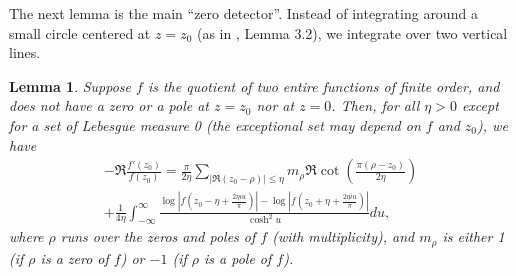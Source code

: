 \documentclass[10pt]{amsart}
\theoremstyle{remark}
\theoremstyle{plain}
\newtheorem{lemma}{Lemma}[section]
\numberwithin{equation}{section}
\theoremstyle{definition}
\def\({\left(}
\def\){\right)}
\def\pfrac#1#2{\left(\frac{#1}{#2}\right)}
\begin{document}
The next lemma is the main ``zero detector''.  Instead of integrating
around a small circle centered at $z=z_0$ (as in \cite{HB2}, Lemma 3.2),
we integrate over two vertical lines.

\begin{lemma}\label{lem:zero detect}
Suppose $f$ is the quotient of two entire 
functions of finite order, and does not have a zero or a pole at $z=z_0$ nor
at $z=0$.
Then, for all $\eta> 0$ except for a set of Lebesgue measure 0 (the exceptional
set may depend on $f$ and $z_0$), we have
\begin{multline*}
-\Re \frac{f'(z_0)}{f(z_0)} = \frac{\pi}{2\eta}\sum_{|\Re 
(z_0-\rho)| \le \eta} m_\rho \Re \cot \pfrac{\pi(\rho-z_0)}{2\eta} \\
+ \frac{1}{4\eta} 
\int_{-\infty}^{\infty} \frac{\log \left| f \(z_0-\eta+
\tfrac{2\eta i u}{\pi} \) \right| -
\log \left| f\(z_0+\eta+\tfrac{2\eta i u}{\pi} \) \right|}{\cosh^2 u} du,
\end{multline*}
where $\rho$ runs over the zeros and poles
of $f$ (with multiplicity), and $m_\rho$ is either 1 (if $\rho$ is a zero of
 $f$) or $-1$ (if $\rho$ is a pole of $f$).
\end{lemma}
\end{document}
